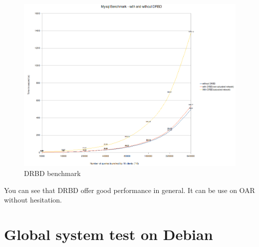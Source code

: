 \documentclass[a4paper,10pt]{report}
\begin{document}
\begin{figure}[H]
\begin{center}
\includegraphics[scale=0.5]{schema/drbd-test.png}
\end{center}
\caption{DRBD benchmark} 
\label{hb-gui-2nodes} 
\end{figure}

You can see that DRBD offer good performance in general. It can be use on OAR without hesitation.



\section{Global system test on Debian}
\end{document}
